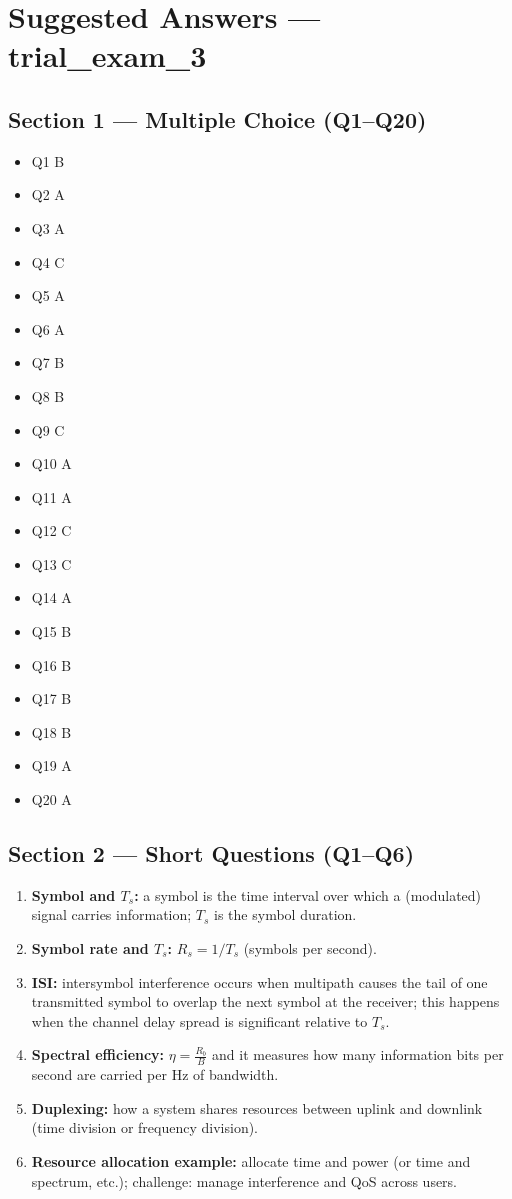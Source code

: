 \documentclass[11pt,a4paper]{article}
\begin{document}
\section*{Suggested Answers --- trial\_exam\_3}

\subsection*{Section 1 --- Multiple Choice (Q1--Q20)}
\begin{itemize}
    \item Q1 B
    \item Q2 A
    \item Q3 A
    \item Q4 C
    \item Q5 A
    \item Q6 A
    \item Q7 B
    \item Q8 B
    \item Q9 C
    \item Q10 A
    \item Q11 A
    \item Q12 C
    \item Q13 C
    \item Q14 A
    \item Q15 B
    \item Q16 B
    \item Q17 B
    \item Q18 B
    \item Q19 A
    \item Q20 A
\end{itemize}

\subsection*{Section 2 --- Short Questions (Q1--Q6)}
\begin{enumerate}[label=\arabic*.]
    \item \textbf{Symbol and $T_s$:} a symbol is the time interval over which a (modulated) signal carries information; $T_s$ is the symbol duration.
    \item \textbf{Symbol rate and $T_s$:} $R_s = 1/T_s$ (symbols per second).
    \item \textbf{ISI:} intersymbol interference occurs when multipath causes the tail of one transmitted symbol to overlap the next symbol at the receiver; this happens when the channel delay spread is significant relative to $T_s$.
    \item \textbf{Spectral efficiency:} $\eta = \frac{R_b}{B}$ and it measures how many information bits per second are carried per Hz of bandwidth.
    \item \textbf{Duplexing:} how a system shares resources between uplink and downlink (time division or frequency division).
    \item \textbf{Resource allocation example:} allocate time and power (or time and spectrum, etc.); challenge: manage interference and QoS across users.
\end{enumerate}
\end{document}
